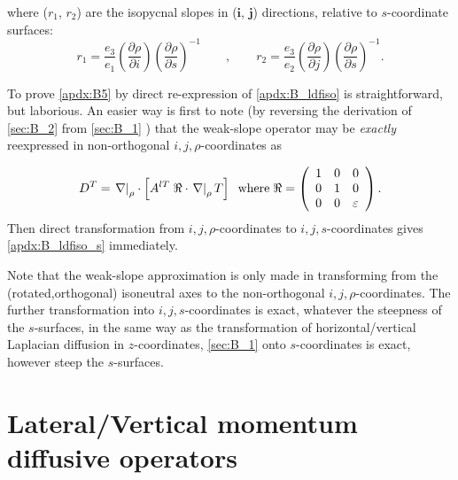 \documentclass[../main/NEMO_manual]{subfiles}
\begin{document}
where ($r_1$, $r_2$) are the isopycnal slopes in ($\textbf{i}$, $\textbf{j}$) directions,
relative to $s$-coordinate surfaces:
\[
  r_1 =\frac{e_3 }{e_1 }\left( {\frac{\partial \rho }{\partial i}} \right)\left( {\frac{\partial \rho }{\partial s}} \right)^{-1}
  \qquad , \qquad
  r_2 =\frac{e_3 }{e_2 }\left( {\frac{\partial \rho }{\partial j}}
  \right)\left( {\frac{\partial \rho }{\partial s}} \right)^{-1}.
\]

To prove \autoref{apdx:B5} by direct re-expression of \autoref{apdx:B_ldfiso} is straightforward, but laborious.
An easier way is first to note (by reversing the derivation of \autoref{sec:B_2} from \autoref{sec:B_1} ) that
the weak-slope operator may be \emph{exactly} reexpressed in non-orthogonal $i,j,\rho$-coordinates as

\begin{equation}
  \label{apdx:B5}
  D^T = \left. \nabla \right|_\rho \cdot
  \left[ A^{lT} \;\Re \cdot \left. \nabla \right|_\rho T  \right] \\
  \;\;\text{where} \;\Re =\left( {{
        \begin{array}{*{20}c}
          1 \hfill & 0 \hfill &0 \hfill \\
          0 \hfill & 1 \hfill & 0 \hfill \\
          0 \hfill & 0 \hfill & \varepsilon \hfill \\
        \end{array}
      }} \right).
\end{equation}
Then direct transformation from $i,j,\rho$-coordinates to $i,j,s$-coordinates gives
\autoref{apdx:B_ldfiso_s} immediately.

Note that the weak-slope approximation is only made in transforming from
the (rotated,orthogonal) isoneutral axes to the non-orthogonal $i,j,\rho$-coordinates.
The further transformation into $i,j,s$-coordinates is exact, whatever the steepness of the $s$-surfaces,
in the same way as the transformation of horizontal/vertical Laplacian diffusion in $z$-coordinates,
\autoref{sec:B_1} onto $s$-coordinates is exact, however steep the $s$-surfaces.


\section{Lateral/Vertical momentum diffusive operators}
\label{sec:B_3}
\end{document}
